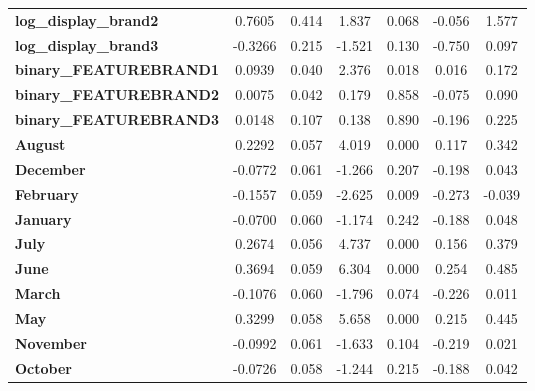 \documentclass[a4paper,11pt]{article}
\begin{document}
\begin{center}
\begin{tabular}{lcccccc}
\textbf{log\_display\_brand2}  &       0.7605  &        0.414     &     1.837  &         0.068        &       -0.056    &        1.577     \\
\textbf{log\_display\_brand3}  &      -0.3266  &        0.215     &    -1.521  &         0.130        &       -0.750    &        0.097     \\
\textbf{binary\_FEATUREBRAND1} &       0.0939  &        0.040     &     2.376  &         0.018        &        0.016    &        0.172     \\
\textbf{binary\_FEATUREBRAND2} &       0.0075  &        0.042     &     0.179  &         0.858        &       -0.075    &        0.090     \\
\textbf{binary\_FEATUREBRAND3} &       0.0148  &        0.107     &     0.138  &         0.890        &       -0.196    &        0.225     \\
\textbf{August}                &       0.2292  &        0.057     &     4.019  &         0.000        &        0.117    &        0.342     \\
\textbf{December}              &      -0.0772  &        0.061     &    -1.266  &         0.207        &       -0.198    &        0.043     \\
\textbf{February}              &      -0.1557  &        0.059     &    -2.625  &         0.009        &       -0.273    &       -0.039     \\
\textbf{January}               &      -0.0700  &        0.060     &    -1.174  &         0.242        &       -0.188    &        0.048     \\
\textbf{July}                  &       0.2674  &        0.056     &     4.737  &         0.000        &        0.156    &        0.379     \\
\textbf{June}                  &       0.3694  &        0.059     &     6.304  &         0.000        &        0.254    &        0.485     \\
\textbf{March}                 &      -0.1076  &        0.060     &    -1.796  &         0.074        &       -0.226    &        0.011     \\
\textbf{May}                   &       0.3299  &        0.058     &     5.658  &         0.000        &        0.215    &        0.445     \\
\textbf{November}              &      -0.0992  &        0.061     &    -1.633  &         0.104        &       -0.219    &        0.021     \\
\textbf{October}               &      -0.0726  &        0.058     &    -1.244  &         0.215        &       -0.188    &        0.042     \\

\end{tabular}
\end{center}
\end{document}
